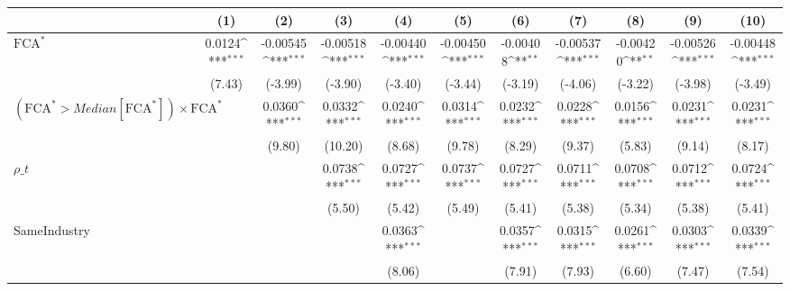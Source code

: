 {
\def\sym#1{\ifmmode^{#1}\else\(^{#1}\)\fi}
\begin{tabular}{l*{10}{c}}
\hline\hline
                    &\multicolumn{1}{c}{(1)}         &\multicolumn{1}{c}{(2)}         &\multicolumn{1}{c}{(3)}         &\multicolumn{1}{c}{(4)}         &\multicolumn{1}{c}{(5)}         &\multicolumn{1}{c}{(6)}         &\multicolumn{1}{c}{(7)}         &\multicolumn{1}{c}{(8)}         &\multicolumn{1}{c}{(9)}         &\multicolumn{1}{c}{(10)}         \\
\hline
$ \text{FCA}^* $    &      0.0124\sym{***}&    -0.00545\sym{***}&    -0.00518\sym{***}&    -0.00440\sym{***}&    -0.00450\sym{***}&    -0.00408\sym{**} &    -0.00537\sym{***}&    -0.00420\sym{**} &    -0.00526\sym{***}&    -0.00448\sym{***}\\
                    &      (7.43)         &     (-3.99)         &     (-3.90)         &     (-3.40)         &     (-3.44)         &     (-3.19)         &     (-4.06)         &     (-3.22)         &     (-3.98)         &     (-3.49)         \\
[1em]
 $ (\text{FCA}^* > Median[\text{FCA}^*]) \times {\text{FCA} ^*}  $ &                     &      0.0360\sym{***}&      0.0332\sym{***}&      0.0240\sym{***}&      0.0314\sym{***}&      0.0232\sym{***}&      0.0228\sym{***}&      0.0156\sym{***}&      0.0231\sym{***}&      0.0231\sym{***}\\
                    &                     &      (9.80)         &     (10.20)         &      (8.68)         &      (9.78)         &      (8.29)         &      (9.37)         &      (5.83)         &      (9.14)         &      (8.17)         \\
[1em]
$ \rho\_t $          &                     &                     &      0.0738\sym{***}&      0.0727\sym{***}&      0.0737\sym{***}&      0.0727\sym{***}&      0.0711\sym{***}&      0.0708\sym{***}&      0.0712\sym{***}&      0.0724\sym{***}\\
                    &                     &                     &      (5.50)         &      (5.42)         &      (5.49)         &      (5.41)         &      (5.38)         &      (5.34)         &      (5.38)         &      (5.41)         \\
[1em]
SameIndustry        &                     &                     &                     &      0.0363\sym{***}&                     &      0.0357\sym{***}&      0.0315\sym{***}&      0.0261\sym{***}&      0.0303\sym{***}&      0.0339\sym{***}\\
                    &                     &                     &                     &      (8.06)         &                     &      (7.91)         &      (7.93)         &      (6.60)         &      (7.47)         &      (7.54)         \\

\end{tabular}}
